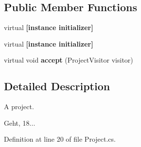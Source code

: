 \subsection*{Public Member Functions}
\begin{DoxyCompactItemize}
\item 
virtual {\bfseries [instance initializer]}\label{class_editor_1_1_model_1_1_project_1_1_project_adfc52520e73648e6419024c3c8e68486}

\item 
virtual {\bfseries [instance initializer]}\label{class_editor_1_1_model_1_1_project_1_1_project_adfc52520e73648e6419024c3c8e68486}

\item 
virtual void {\bfseries accept} (Project\-Visitor visitor)\label{class_editor_1_1_model_1_1_project_1_1_project_a55ae2b7c6b3ffd67b38e1cde96e856e9}

\end{DoxyCompactItemize}


\subsection{Detailed Description}
A project. 

Geht, 18... 

Definition at line 20 of file Project.\-cs.

